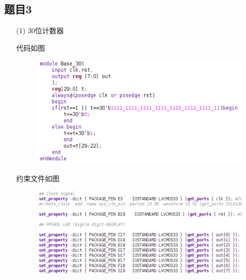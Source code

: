\documentclass{article}
\begin{document}
    \subsection*{题目3}
    \begin{enumerate}
        \item [(1)]30位计数器
        
        代码如图
        \begin{figure}[htbp]
            \centering
            \includegraphics[]{base_30_v}
        \end{figure}

        \clearpage

        约束文件如图
        \begin{figure}[htbp]
            \centering
            \includegraphics[scale=0.8]{base_30_x}
        \end{figure}


\end{enumerate}
\end{document}
